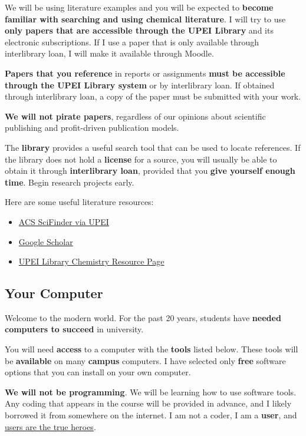 We will be using literature examples and you will be expected to \textbf{become familiar with searching and using chemical literature}. I will try to use \textbf{only papers that are accessible through the UPEI Library} and its electronic subscriptions. If I use a paper that is only available through interlibrary loan, I will make it available through Moodle.

\textbf{Papers that you reference} in reports or assignments \textbf{must be accessible through the UPEI Library system} or by interlibrary loan. If obtained through interlibrary loan, a copy of the paper must be submitted with your work.

\textbf{We will not pirate papers}, regardless of our opinions about scientific publishing and profit-driven publication models.

The \textbf{library} provides a useful search tool that can be used to locate references. If the library does not hold a \textbf{license} for a source, you will usually be able to obtain it through \textbf{interlibrary loan}, provided that you \textbf{give yourself enough time}. Begin research projects early.

Here are some useful literature resources:

\begin{itemize}
\item \href{https://library.upei.ca/scifinder}{ACS SciFinder via UPEI}
\item \href{https://scholar.google.ca}{Google Scholar}
\item \href{https://library.upei.ca/subject/chemistry}{UPEI Library Chemistry Resource Page}
\end{itemize}

\subsection{Your Computer}

Welcome to the modern world. For the past 20 years, students have \textbf{needed computers to succeed} in university.

You will need \textbf{access} to a computer with the \textbf{tools} listed below. These tools will be \textbf{available} on many \textbf{campus} computers. I have selected only \textbf{free} software options that you can install on your own computer.

\textbf{We will not be programming}. We will be learning how to use software tools. Any coding that appears in the course will be provided in advance, and I likely borrowed it from somewhere on the internet. I am not a coder, I am a \textbf{user}, and \href{https://en.wikipedia.org/wiki/Tron}{users are the true heroes}.


